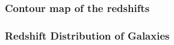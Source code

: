\documentclass{beamer}
\begin{document}
\begin{frame}
	\frametitle{Contour map of the redshifts}
    \begin{figure}
    \end{figure}
    \end{frame}
\begin{frame}
	\frametitle{Redshift Distribution of Galaxies}
    \begin{figure}
        
    \end{figure}
    \end{frame}
\end{document}
